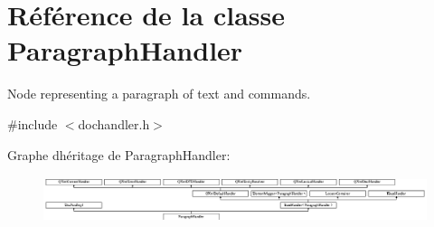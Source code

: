 \hypertarget{class_paragraph_handler}{}\section{Référence de la classe Paragraph\+Handler}
\label{class_paragraph_handler}


Node representing a paragraph of text and commands.  




{\ttfamily \#include $<$dochandler.\+h$>$}

Graphe d\textquotesingle{}héritage de Paragraph\+Handler\+:\begin{figure}[H]
\begin{center}
\leavevmode
\includegraphics[height=1.350211cm]{class_paragraph_handler}
\end{center}
\end{figure}
